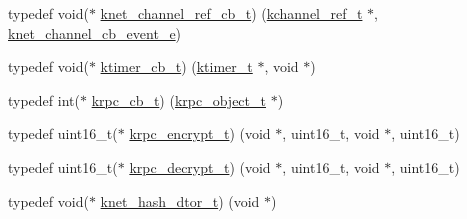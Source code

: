 \begin{DoxyCompactItemize}
\item 
typedef void($\ast$ \hyperlink{a00051_a8a7d96123ef4565c6d08fe58a10476a9_a8a7d96123ef4565c6d08fe58a10476a9}{knet\+\_\+channel\+\_\+ref\+\_\+cb\+\_\+t}) (\hyperlink{a00051_a3b7e82599367eade261456f60ebe2cd9_a3b7e82599367eade261456f60ebe2cd9}{kchannel\+\_\+ref\+\_\+t} $\ast$, \hyperlink{a00051_a2fd2faf971268f5b682ab375c455f7c9_a2fd2faf971268f5b682ab375c455f7c9}{knet\+\_\+channel\+\_\+cb\+\_\+event\+\_\+e})
\item 
typedef void($\ast$ \hyperlink{a00051_a2333fd0f2c3a85faf586300ca40deed4_a2333fd0f2c3a85faf586300ca40deed4}{ktimer\+\_\+cb\+\_\+t}) (\hyperlink{a00051_a846172ea4e8a86449eca41a3d8e074b7_a846172ea4e8a86449eca41a3d8e074b7}{ktimer\+\_\+t} $\ast$, void $\ast$)
\item 
typedef int($\ast$ \hyperlink{a00051_a06bb708c1b97445d3a5d0c1b32ad2ab6_a06bb708c1b97445d3a5d0c1b32ad2ab6}{krpc\+\_\+cb\+\_\+t}) (\hyperlink{a00051_a9c07dfc8c3b965f75b09f82fdb1bbb1e_a9c07dfc8c3b965f75b09f82fdb1bbb1e}{krpc\+\_\+object\+\_\+t} $\ast$)
\item 
typedef uint16\+\_\+t($\ast$ \hyperlink{a00051_ae41a67cc07f8dff897ca978e03b1f2d7_ae41a67cc07f8dff897ca978e03b1f2d7}{krpc\+\_\+encrypt\+\_\+t}) (void $\ast$, uint16\+\_\+t, void $\ast$, uint16\+\_\+t)
\item 
typedef uint16\+\_\+t($\ast$ \hyperlink{a00051_a5cf750f151c90f0589f68fe8c4421f1d_a5cf750f151c90f0589f68fe8c4421f1d}{krpc\+\_\+decrypt\+\_\+t}) (void $\ast$, uint16\+\_\+t, void $\ast$, uint16\+\_\+t)
\item 
typedef void($\ast$ \hyperlink{a00051_af806592520383146be2f3aac316beb45_af806592520383146be2f3aac316beb45}{knet\+\_\+hash\+\_\+dtor\+\_\+t}) (void $\ast$)
\end{DoxyCompactItemize}
